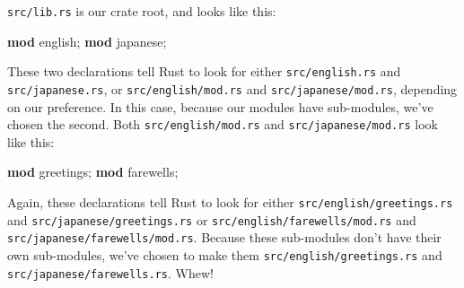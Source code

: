 \documentclass[a4paper,]{book}
\newenvironment{Shaded}{\begin{snugshade}}{\end{snugshade}}
\newcommand{\KeywordTok}[1]{\textcolor[rgb]{0.13,0.29,0.53}{\textbf{{#1}}}}
\newcommand{\NormalTok}[1]{{#1}}
\begin{document}
\begin{Shaded}
\end{Shaded}

\texttt{src/lib.rs} is our crate root, and looks like this:

\begin{Shaded}
\begin{Highlighting}[]
\KeywordTok{mod} \NormalTok{english;}
\KeywordTok{mod} \NormalTok{japanese;}
\end{Highlighting}
\end{Shaded}

These two declarations tell Rust to look for either
\texttt{src/english.rs} and \texttt{src/japanese.rs}, or
\texttt{src/english/mod.rs} and \texttt{src/japanese/mod.rs}, depending
on our preference. In this case, because our modules have sub-modules,
we've chosen the second. Both \texttt{src/english/mod.rs} and
\texttt{src/japanese/mod.rs} look like this:

\begin{Shaded}
\begin{Highlighting}[]
\KeywordTok{mod} \NormalTok{greetings;}
\KeywordTok{mod} \NormalTok{farewells;}
\end{Highlighting}
\end{Shaded}

Again, these declarations tell Rust to look for either
\texttt{src/english/greetings.rs} and \texttt{src/japanese/greetings.rs}
or \texttt{src/english/farewells/mod.rs} and
\texttt{src/japanese/farewells/mod.rs}. Because these sub-modules don't
have their own sub-modules, we've chosen to make them
\texttt{src/english/greetings.rs} and
\texttt{src/japanese/farewells.rs}. Whew!
\end{document}
